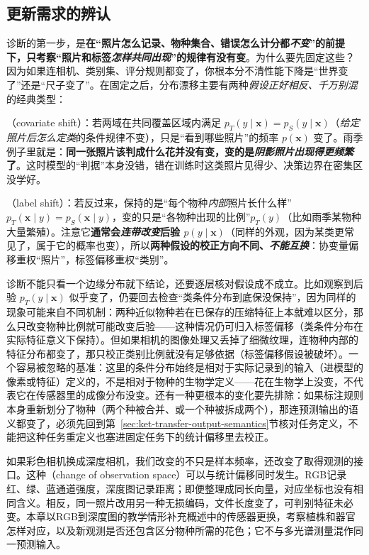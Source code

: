\subsection{更新需求的辨认}
\label{sec:ket-update-needs}

诊断的第一步，是\textbf{在“照片怎么记录、物种集合、错误怎么计分都\emph{不变}”的前提下，只考察“照片和标签\emph{怎样共同出现}”的规律有没有变}。为什么要先固定这些？因为如果连相机、类别集、评分规则都变了，你根本分不清性能下降是“世界变了”还是“尺子变了”。在固定之后，分布漂移主要有两种\emph{假设正好相反、千万别混}的经典类型：

（covariate shift）：若两域在共同覆盖区域内满足 $p_T(y\mid\bm{x})=p_S(y\mid\bm{x})$（\emph{给定照片后怎么定类}的条件规律不变），只是“看到哪些照片”的频率 $p(\bm{x})$ 变了。雨季例子里就是：\textbf{同一张照片该判成什么花并没有变，变的是\emph{阴影照片出现得更频繁}了}。这时模型的“判据”本身没错，错在训练时这类照片见得少、决策边界在密集区没学好。

（label shift）：若反过来，保持的是“每个物种\emph{内部}照片长什么样”$p_T(\bm{x}\mid y)=p_S(\bm{x}\mid y)$，变的只是“各物种出现的比例”$p_T(y)$（比如雨季某物种大量繁殖）。注意它\textbf{通常会\emph{连带改变}后验 $p(y\mid\bm{x})$}（同样的外观，因为某类更常见了，属于它的概率也变），所以\textbf{两种假设的校正方向不同、\emph{不能互换}}：协变量偏移重权“照片”，标签偏移重权“类别”。

诊断不能只看一个边缘分布就下结论，还要逐层核对假设成不成立。比如观察到后验 $p_T(y\mid\bm{x})$ 似乎变了，仍要回去检查“类条件分布到底保没保持”，因为同样的现象可能来自不同机制：两种近似物种若在已保存的压缩特征上本就难以区分，那么只改变物种比例就可能改变后验——这种情况仍可归入标签偏移（类条件分布在实际特征意义下保持）。但如果相机的图像处理又丢掉了细微纹理，连物种内部的特征分布都变了，那只校正类别比例就没有足够依据（标签偏移假设被破坏）。一个容易被忽略的基准：这里的条件分布始终是相对于实际记录到的输入（进模型的像素或特征）定义的，不是相对于物种的生物学定义——花在生物学上没变，不代表它在传感器里的成像分布没变。还有一种更根本的变化要先排除：如果标注规则本身重新划分了物种（两个种被合并、或一个种被拆成两个），那连预测输出的语义都变了，必须先回到第~\ref{sec:ket-transfer-output-semantics}节核对任务定义，不能把这种任务重定义也塞进固定任务下的统计偏移里去校正。

如果彩色相机换成深度相机，我们改变的不只是样本频率，还改变了取得观测的接口。这种（change of observation space）可以与统计偏移同时发生。RGB记录红、绿、蓝通道强度，深度图记录距离；即便整理成同长向量，对应坐标也没有相同含义。相反，同一照片改用另一种无损编码，文件长度变了，可判别特征未必变。本章以RGB到深度图的教学情形补充概述中的传感器更换，考察植株和器官怎样对应，以及新观测是否还包含区分物种所需的花色；它不与多光谱测量混作同一预测输入。

